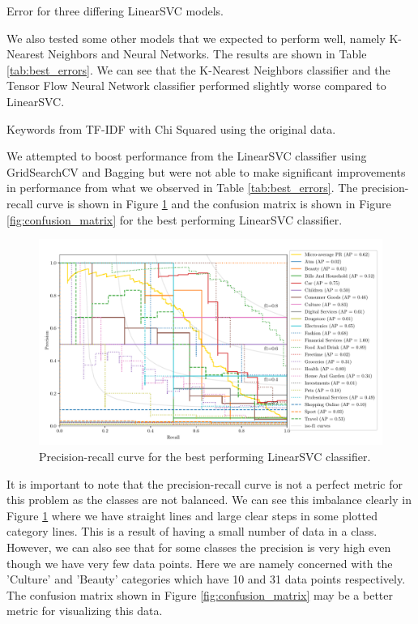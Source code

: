 \begin{table}[!ht]
\centering
\caption{Error for three differing LinearSVC models.}

\label{tab:lsvc_errors}
\end{table}

We also tested some other models that we expected to perform well, namely K-Nearest Neighbors and Neural Networks. The results are shown in Table \ref{tab:best_errors}. We can see that the K-Nearest Neighbors classifier and the Tensor Flow Neural Network classifier performed slightly worse compared to LinearSVC.

\begin{table}[!ht]
\centering
\caption{Keywords from TF-IDF with Chi Squared using the original data.}

\label{tab:best_errors}
\end{table}

We attempted to boost performance from the LinearSVC classifier using GridSearchCV and Bagging but were not able to make significant improvements in performance from what we observed in Table \ref{tab:best_errors}. The precision-recall curve is shown in Figure \ref{fig:pr_curve} and the confusion matrix is shown in Figure \ref{fig:confusion_matrix} for the best performing LinearSVC classifier.

\begin{figure}[ht]
  \centering
  \includegraphics[width=\textwidth]{../img/plot_pr_curve.pdf}
  \caption{Precision-recall curve for the best performing LinearSVC classifier.}
  \label{fig:pr_curve}
\end{figure}

It is important to note that the precision-recall curve is not a perfect metric for this problem as the classes are not balanced. We can see this imbalance clearly in Figure \ref{fig:pr_curve} where we have straight lines and large clear steps in some plotted category lines. This is a result of having a small number of data in a class. However, we can also see that for some classes the precision is very high even though we have very few data points. Here we are namely concerned with the 'Culture' and 'Beauty' categories which have 10 and 31 data points respectively. The confusion matrix shown in Figure \ref{fig:confusion_matrix} may be a better metric for visualizing this data. 

